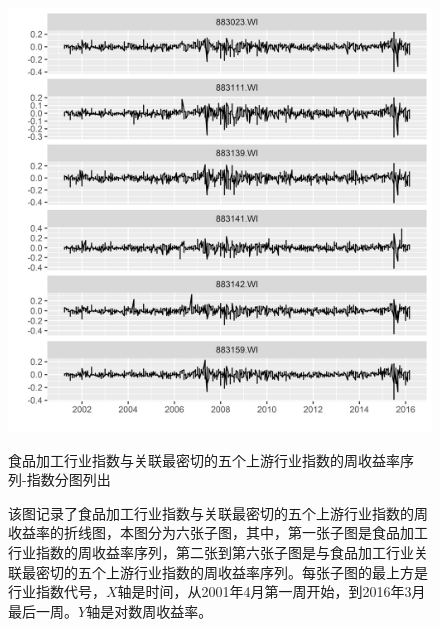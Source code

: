 \documentclass{sysuthesis}
\begin{document}
  \begin{figure}[htbp]
  \centering
  \includegraphics[scale=0.8]{image/883111-topk-upper-plus-one-weeklyyield-single.png}
  \caption{食品加工行业指数与关联最密切的五个上游行业指数的周收益率序列-指数分图列出}
  \caption*{\footnotesize 该图记录了食品加工行业指数与关联最密切的五个上游行业指数的周收益率的折线图，本图分为六张子图，其中，第一张子图是食品加工行业指数的周收益率序列，第二张到第六张子图是与食品加工行业关联最密切的五个上游行业指数的周收益率序列。每张子图的最上方是行业指数代号，$X$轴是时间，从2001年4月第一周开始，到2016年3月最后一周。$Y$轴是对数周收益率。}
  \label{fig:883111-topk-upper-plus-one-weeklyyield-single}
  \end{figure}
\end{document}
